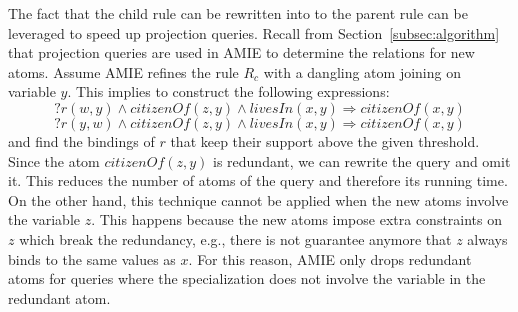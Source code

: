 {%
% 
The fact that the child rule can be rewritten into to the parent rule can be leveraged to speed up projection queries.
Recall from Section~\ref{subsec:algorithm} that projection queries are used in AMIE to determine the
relations for new atoms. Assume AMIE refines the rule $R_c$ with a dangling atom
joining on variable $y$. This implies to construct the following expressions:
\[
?r(w,y) \wedge \textit{citizenOf}(z,y)\wedge \textit{livesIn}(x,y)\Rightarrow \textit{citizenOf}(x,y)
\]
\[
?r(y,w) \wedge \textit{citizenOf}(z,y)\wedge \textit{livesIn}(x,y)\Rightarrow \textit{citizenOf}(x,y)
\]
\noindent and find the bindings of $r$ that keep their support above the given threshold.
Since the atom $citizenOf(z,y)$ is redundant, we can rewrite the query and omit it.
This reduces the number of atoms of the query and therefore its running time.
On the other hand, this technique cannot be applied when the new atoms involve the variable $z$. This happens
because the new atoms impose extra constraints on $z$ which break the redundancy, e.g., 
there is not guarantee anymore that $z$ always binds to the same values as $x$. For this reason, AMIE only 
drops redundant atoms for queries where the specialization does not involve the variable in the redundant atom.




}
